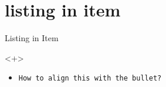 \documentclass[aspectratio=169]{beamer}
\begin{document}
    \section{listing in item}
        \begin{frame}[t, fragile]{Listing in Item}
            \begin{onlyenv}<+>
                \begin{itemize}
                    \item
                        \begin{lstlisting}[autogobble,aboveskip=-.8\baselineskip]
                            How to align this with the bullet? 
                        \end{lstlisting}
                \end{itemize}
            \end{onlyenv}
        \end{frame}
\end{document}
